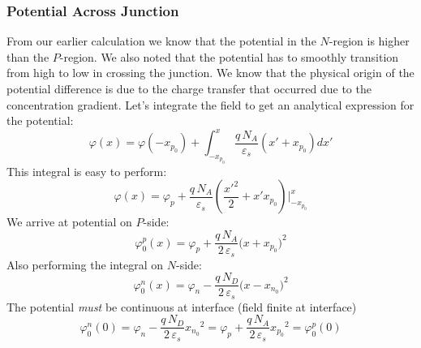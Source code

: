\subsubsection{Potential Across Junction}
From our earlier calculation we know that the potential in the $N$-region is higher than the  $P$-region.  We also noted that the potential has to smoothly transition from high to low in crossing the junction.   We know that the physical origin of the potential difference is due to the charge transfer that occurred due to the concentration gradient.   Let's integrate the field to get an analytical expression for the potential:
    \begin{equation*}
        \varphi(x) = \varphi(-x_{p_0}) + \int_{-x_{p_0}}^{x} \frac{q\,N_A}{\varepsilon_s}(x' + x_{p_0})dx' 
    \end{equation*}
This integral is easy to perform:
    \begin{equation*}
        \varphi(x) = \varphi_p + \frac{q\,N_A}{\varepsilon_s}
                    \left( {\frac{{x{'^2}}}{2} + x'x_{p_0}} \right)
                    \big\vert_{-x_{p_0}}^x 
    \end{equation*}
We arrive at potential on $P$-side:
    \begin{equation*}
        \varphi_0^p(x) = \varphi_p + \frac{q\,N_A}{2\,\varepsilon_s}{(x + {x_{p_0})}^2} 
    \end{equation*}
Also performing the integral on $N$-side:
    \begin{equation*}
        \varphi_0^n(x) = \varphi_n - \frac{q\,N_D}{2\,\varepsilon_s}{(x - {x_{n_0})}^2} 
    \end{equation*}
The potential \textit{must} be continuous at interface (field finite at interface)
    \begin{equation*}
        \varphi_0^n(0) = \varphi_n - \frac{q\,N_D}{2\,\varepsilon_s}{{x_{n_0}}^2} 
                        = \varphi_p + \frac{q\,N_A}{2\,\varepsilon_s}{{x_{p_0}}^2} = \varphi_0^p(0)
    \end{equation*}
